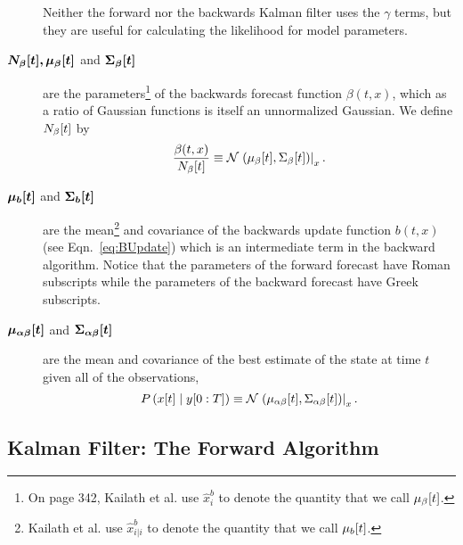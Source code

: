 \begin{description}
  Neither the forward nor the backwards Kalman filter uses the $\gamma$
  terms, but they are useful for calculating the likelihood for model
  parameters.
\item[$\bm{{N_\beta}{[t]},{\mu_\beta}{[t]}}$ and
  $\bm{{\Sigma_\beta}{[t]}}$] are the parameters\footnote{On page
    342, Kailath et al.\cite{KSH00} use $\hat x_i^b$ to denote the
    quantity that we call ${\mu_\beta}{[t]}$.} of the
  backwards forecast function $\beta(t,x)$, which as a ratio of
  Gaussian functions is itself an unnormalized Gaussian.  We define
  ${N_\beta}{[t]}$ by
  \begin{equation*}
    \frac{\beta(t,x)}{{N_\beta}{[t]}} \equiv
    {\mathcal{N}}\left.\left({\mu_\beta}{[t]},{\Sigma_\beta}{[t]}\right)\right|_{x}.
  \end{equation*}
\item[$\bm{{\mu_b}{[t]}}$ and $\bm{{\Sigma_b}{[t]}}$] are the
  mean\footnote{Kailath et al.\cite{KSH00} use $\hat x_{i|i}^b$ to
    denote the quantity that we call ${\mu_b}{[t]}$.} and covariance
  of the backwards update function $b(t,x)$ (see Eqn.~\eqref{eq:BUpdate})
  which is an intermediate term in the backward algorithm.  Notice
  that the parameters of the forward forecast have Roman subscripts
  while the parameters of the backward forecast have Greek subscripts.
\item[$\bm{{\mu_{\alpha\beta}}{[t]}}$ and
  $\bm{{\Sigma_{\alpha\beta}}{[t]}}$] are the mean and covariance
  of the best estimate of the state at time $t$ given all of the
  observations, \ie
  \begin{equation*}
    P \left({x}{[t]}\mid y[0:T]
  \right) \equiv
  {\mathcal{N}}\left.\left({\mu_{\alpha\beta}}{[t]},{\Sigma_{\alpha\beta}}{[t]}\right)\right|_{x}.
  \end{equation*}
\end{description}

\subsection{Kalman Filter: The Forward Algorithm}

